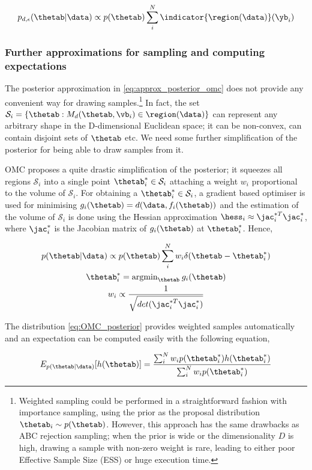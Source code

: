 \begin{equation} \label{eq:approx_posterior_omc}
  p_{d,\epsilon}(\thetab|\data)
  \propto p(\thetab) \sum_i^N \indicator{ \region(\data)} (\yb_i)
\end{equation}

\subsubsection*{Further approximations for sampling and computing expectations}

The posterior approximation in \eqref{eq:approx_posterior_omc} does
not provide any convenient way for drawing samples.\footnote{Weighted
  sampling could be performed in a straightforward fashion with
  importance sampling, using the prior as the proposal distribution
  $\thetab_i \sim p(\thetab)$. However, this approach has the same
  drawbacks as ABC rejection sampling; when the prior is wide or the
  dimensionality $D$ is high, drawing a sample with non-zero weight is
  rare, leading to either poor Effective Sample Size (ESS) or huge
  execution time.} In fact, the set
$\mathcal{S}_i = \{ \thetab: M_d(\thetab, \vb_i) \in \region(\data)
\}$ can represent any arbitrary shape in the D-dimensional Euclidean
space; it can be non-convex, can contain disjoint sets of $\thetab$
etc. We need some further simplification of the posterior for being
able to draw samples from it.

OMC proposes a quite drastic simplification of the posterior; it
squeezes all regions $\mathcal{S}_i$ into a single point
$\thetab_i^* \in \mathcal{S}_i$ attaching a weight $w_i$ proportional
to the volume of $\mathcal{S}_i$. For obtaining a
$\thetab_i^* \in \mathcal{S}_i$, a gradient based optimiser is used
for minimising $g_i(\thetab) = d(\data, f_i(\thetab))$ and the
estimation of the volume of $\mathcal{S}_i$ is done using the Hessian
approximation $\hess_i \approx \jac_i^{*T}\jac_i^*$, where $\jac_i^*$
is the Jacobian matrix of $g_i(\thetab)$ at $\thetab_i^*$. Hence,

\begin{gather} \label{eq:OMC_posterior}
    p(\thetab|\data) \propto p(\thetab) \sum_i^N w_i \delta(\thetab - \thetab_i^*)\\
  \thetab_i^* = \text{argmin}_{\thetab} \:g_i(\thetab) \\
  w_i \propto \frac{1}{\sqrt{det( \jac_i^{*T}\jac_i^*)}}
\end{gather}

The distribution \eqref{eq:OMC_posterior} provides weighted samples
automatically and an expectation can be computed easily with the
following equation,

\begin{equation}
  \label{eq:OMC_expectation}
  E_{p(\thetab|\data)}[h(\thetab)] = \frac{\sum_i^N w_i p(\thetab_i^*)h(\thetab_i^*)}{\sum_i^N w_i p(\thetab_i^*)}
\end{equation}
